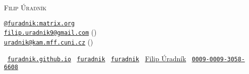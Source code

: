 \newenvironment{work}[4] {{\textsc{#1}, \textbf{#2} \hfill \gray\small\itshape #4,\hspace{3pt} #3}\break\small}{}
\newcommand\worksplit{\vspace{.9em}}

\newcommand\skill[2]{ {#1}.\; {\gray\small\itshape #2}}
\newcommand\skillsplit{\vspace{.9em}}
\newcommand\schoolsplit{\vspace{1.5em}}

\newenvironment{school}[4]
{{\textbf{#1}\hfill \gray\small\itshape #2,\hspace{3pt} #4\break}\textsc{#3}\hfill\break\small}{}

\newenvironment{intro}{\vspace{.3em}\begin{quote}}{\end{quote}\vspace{.3em}}




\begin{multicols}{2}
	{\fontsize{36}{36}\selectfont\scshape{Filip Úradník}} %

	\columnbreak
	\hfill
	\begin{minipage}{.330\textwidth}
	\small
	\hspace{.4em}\hfill\break
	\texttt{\href{https://matrix.to/\#/@furadnik:matrix.org}{@furadnik:matrix.org}} \\
	\texttt{\href{mailto:filip.uradnik9@gmail.com}{filip.uradnik9@gmail.com}}\; () \\
	\texttt{\href{mailto:uradnik@kam.mff.cuni.cz}{uradnik@kam.mff.cuni.cz}} \; ()
	\end{minipage}
\end{multicols}

\begin{center}
	\small
	\hspace{.5in}
	\faGlobe\ \texttt{\href{https://furadnik.github.io}{furadnik.github.io}}
	\hfill
	\faGithub\ \texttt{\href{https://github.com/furadnik}{furadnik}}                                                                      
	\hfill
	\faLinkedin\ \texttt{\href{https://www.linkedin.com/in/furadnik/}{furadnik}}
	\hfill
	\aiGoogleScholarSquare\ \href{https://scholar.google.com/citations?user=7AvTiqgAAAAJ}{Filip Úradník}
	\hfill
	\aiOrcid\ \texttt{\href{https://orcid.org/0009-0009-3058-6608}{0009-0009-3058-6608}}
	\hspace{.5in}

\end{center}

